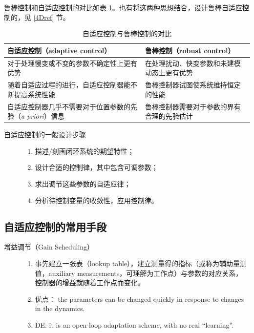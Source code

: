 鲁棒控制和自适应控制的对比如表 \ref{adaptive_robust_table}。也有将这两种思想结合，设计鲁棒自适应控制的，见 \ref{4Dref} 节。
\newpage
  \begin{table}[htbp]
    \vspace{5pt}
    \caption{自适应控制与鲁棒控制的对比}
    \label{adaptive_robust_table}
    \setcellgapes{4pt}
    \makegapedcells
    \small
    \centering
    \begin{tabular}{p{}|p{}}
      \hline
      {\bf 自适应控制（adaptive control）} & {\bf 鲁棒控制（robust control）} \\
      \hline
      对于处理慢变或不变的参数不确定性上更有优势 & 在处理扰动、快变参数和未建模动态上更有优势\\
      \hline
      随着自适应过程的进行，自适应控制器能不断提高系统性能 & 鲁棒控制器试图使系统维持恒定的性能 \\
      \hline
      自适应控制器几乎不需要对于位置参数的先验（{\it a priori}）信息 & 鲁棒控制器需要对于参数的界有合理的先验估计\\
      \hline
    \end{tabular}
  \end{table}

\begin{description}
  \item[自适应控制的一般设计步骤] 
  \begin{enumerate}
    \item 描述/刻画闭环系统的期望特性；
    \item 设计合适的控制律，其中包含可调参数；
    \item 求出调节这些参数的自适应律；
    \item 分析待控制变量的收敛性，应用控制律。
  \end{enumerate}
\end{description}
\subsection{自适应控制的常用手段}
  \begin{description}
    \item[增益调节（Gain Scheduling）]
    \begin{enumerate}
      \item 事先建立一张表（lookup table），建立测量得的指标（或称为辅助量测值，auxiliary measurements，可理解为工作点）与参数的对应关系，
      控制器的增益就随着工作点而变化。
      
      \item 优点： the parameters can be changed quickly in response to changes in
      the dynamics.
      
      \item DE: it is an open-loop adaptation scheme, with no real ``learning''.
    \end{enumerate}
  \end{description}

